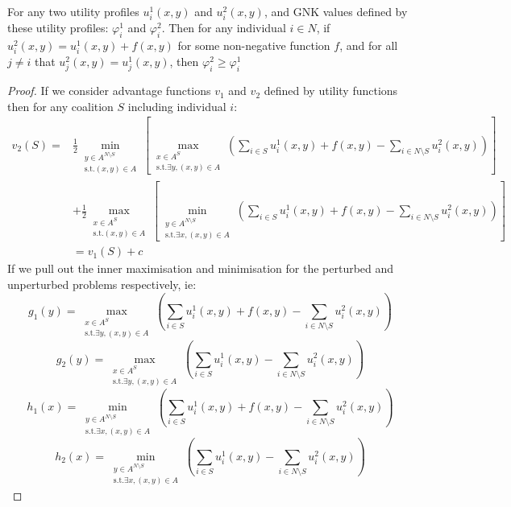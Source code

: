 \begin{theorem}\DIFaddbegin \label{thm:appendix_monotone2}
\DIFaddend For any two utility profiles $u^1_i(x,y)$ and $u^2_i(x,y)$, and GNK values defined by these utility profiles: $\varphi_i^1$ and $\varphi_i^2$.
Then for any individual $i\in N$, if $u_i^2(x,y) = u_i^1(x,y)+f(x,y)$ for some non-negative function $f$, and for all $j\neq i$ that $u^2_j(x,y) = u^1_j(x,y)$, then $\varphi_i^2 \ge \varphi_i^1$ 
\end{theorem}
\begin{proof}
If we consider advantage functions $v_1$ and $v_2$ defined by utility functions \DIFdelbegin {}\DIFdelend \DIFaddbegin {}\DIFaddend then for any coalition $S$ including individual $i$:
\begin{align}
v_2(S) = &
\frac{1}{2}\min_{\substack{y\in A^{N\setminus S} \\ \text{s.t.}(x,y)\in A}} \left[
\max_{\substack{x\in A^S \\ \text{s.t.}\exists y,(x,y)\in A}}
	\left(\sum_{i\in S} u^1_i(x,y)+f(x,y) - \sum_{i\in N\setminus S}u_i^2(x,y)\right)\right]\nonumber\\
& +
\frac{1}{2}\max_{\substack{x\in A^S \\ \text{s.t.}(x,y)\in A}} \left[
\min_{\substack{y\in A^{N\setminus S} \\ \text{s.t.}\exists x,(x,y)\in A}}
	\left(\sum_{i\in S} u^1_i(x,y)+f(x,y) - \sum_{i\in N\setminus S} u_i^2(x,y) \right) \right]\nonumber\\
&= v_1(S)+c\nonumber
\end{align}
If we pull out the inner maximisation and minimisation for the perturbed and unperturbed problems respectively, ie:
$$ g_1(y) = 
\max_{\substack{x\in A^S \\ \text{s.t.}\exists y,(x,y)\in A}}
	\left(\sum_{i\in S} u^1_i(x,y)+f(x,y) - \sum_{i\in N\setminus S}u_i^2(x,y)\right)
$$
$$g_2(y) = 
\max_{\substack{x\in A^S \\ \text{s.t.}\exists y,(x,y)\in A}}
	\left(\sum_{i\in S} u^1_i(x,y) - \sum_{i\in N\setminus S}u_i^2(x,y)\right) $$
$$h_1(x) = 
\min_{\substack{y\in A^{N\setminus S} \\ \text{s.t.}\exists x,(x,y)\in A}}
	\left(\sum_{i\in S} u^1_i(x,y)+f(x,y) - \sum_{i\in N\setminus S} u_i^2(x,y) \right)$$
$$h_2(x) = 
\min_{\substack{y\in A^{N\setminus S} \\ \text{s.t.}\exists x,(x,y)\in A}}
	\left(\sum_{i\in S} u^1_i(x,y) - \sum_{i\in N\setminus S} u_i^2(x,y) \right)$$


\end{proof}
